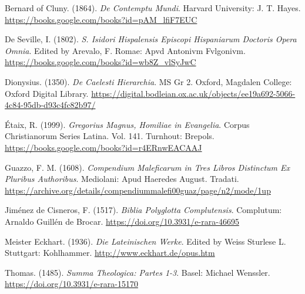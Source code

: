 \documentclass[
]{article}
\begin{document}
Bernard of Cluny. (1864). \emph{De Contemptu Mundi}. Harvard University:
J. T. Hayes. \url{https://books.google.com/books?id=pAM_lfiF7EUC}

De Seville, I. (1802). \emph{S. Isidori Hispalensis Episcopi Hispaniarum
Doctoris Opera Omnia}. Edited by Arevalo, F. Romae: Apvd Antonivm
Fvlgonivm. \url{https://books.google.com/books?id=wb8Z_vlSyJwC}

Dionysius. (1350). \emph{De Caelesti Hierarchia}. MS Gr 2. Oxford,
Magdalen College: Oxford Digital Library.
\url{https://digital.bodleian.ox.ac.uk/objects/ee19a692-5066-4c84-95db-d93c4fc82b97/}

Étaix, R. (1999). \emph{Gregorius Magnus, Homiliae in Evangelia}. Corpus
Christianorum Series Latina. Vol. 141. Turnhout: Brepols.
\url{https://books.google.com/books?id=r4ERnwEACAAJ}

Guazzo, F. M. (1608). \emph{Compendium Maleficarum in Tres Libros
Distinctum Ex Pluribus Authoribus}. Mediolani: Apud Haeredes August.
Tradati.
\url{https://archive.org/details/compendiummalefi00guaz/page/n2/mode/1up}

Jiménez de Cisneros, F. (1517). \emph{Biblia Polyglotta Complutensis}.
Complutum: Arnaldo Guillén de Brocar.
\url{https://doi.org/10.3931/e-rara-46695}

Meister Eckhart. (1936). \emph{Die Lateinischen Werke}. Edited by Weiss
Sturlese L. Stuttgart: Kohlhammer. \url{http://www.eckhart.de/opus.htm}

Thomas. (1485). \emph{Summa Theologica: Partes 1-3}. Basel: Michael
Wenssler. \url{https://doi.org/10.3931/e-rara-15170}
\end{document}
